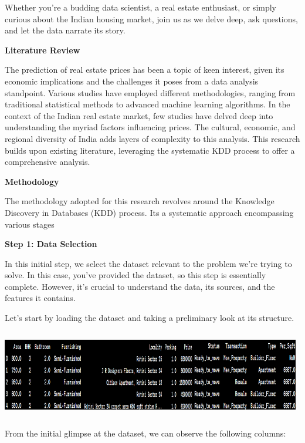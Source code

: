 \documentclass[]{article}
\newcommand{\textcenter}[1]{\begin{center} \vspace{10px}\textbf{\large #1} \end{center}}
\begin{document}
Whether you're a budding data scientist, a real estate enthusiast, or
simply curious about the Indian housing market, join us as we delve
deep, ask questions, and let the data narrate its story.
\textcenter{Literature Review}

The prediction of real estate prices has been a topic of keen interest,
given its economic implications and the challenges it poses from a data
analysis standpoint. Various studies have employed different
methodologies, ranging from traditional statistical methods to advanced
machine learning algorithms. In the context of the Indian real estate
market, few studies have delved deep into understanding the myriad
factors influencing prices. The cultural, economic, and regional
diversity of India adds layers of complexity to this analysis. This
research builds upon existing literature, leveraging the systematic KDD
process to offer a comprehensive analysis.

\textcenter{Methodology}

The methodology adopted for this research revolves around the Knowledge
Discovery in Databases (KDD) process. It\textquotesingle s a systematic
approach encompassing various stages

\textcenter{Step 1: Data Selection}

In this initial step, we select the dataset relevant to the problem
we're trying to solve. In this case, you've provided the dataset, so
this step is essentially complete. However, it's crucial to understand
the data, its sources, and the features it contains.

Let's start by loading the dataset and taking a preliminary look at its
structure.

\includegraphics[width=5.16806in,height=1.51181in]{image1.png}

From the initial glimpse at the dataset, we can observe the following
columns:
\end{document}
